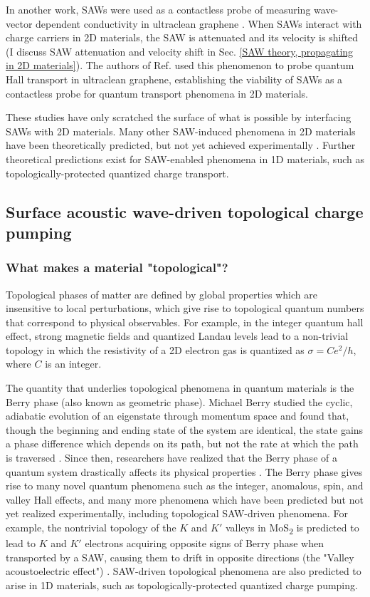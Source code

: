 \documentclass[double,12pt,1in]{beavtex}
\begin{document}
In another work, SAWs were used as a contactless probe of measuring wave-vector dependent conductivity in ultraclean graphene \cite{fang_quantum_2023}. When SAWs interact with charge carriers in 2D materials, the SAW is attenuated and its velocity is shifted (I discuss SAW attenuation and velocity shift in Sec. \ref{SAW theory, propagating in 2D materials}). The authors of Ref. \cite{fang_quantum_2023} used this phenomenon to probe quantum Hall transport in ultraclean graphene, establishing the viability of SAWs as a contactless probe for quantum transport phenomena in 2D materials. 

These studies have only scratched the surface of what is possible by interfacing SAWs with 2D materials. Many other SAW-induced phenomena in 2D materials have been theoretically predicted, but not yet achieved experimentally \cite{nie_surface_2023}. Further theoretical predictions exist for SAW-enabled phenomena in 1D materials, such as topologically-protected quantized charge transport.

\subsection{Surface acoustic wave-driven topological charge pumping}

\subsubsection{What makes a material "topological"?}

Topological phases of matter are defined by global properties which are insensitive to local perturbations, which give rise to topological quantum numbers that correspond to physical observables. For example, in the integer quantum hall effect, strong magnetic fields and quantized Landau levels lead to a non-trivial topology in which the resistivity of a 2D electron gas is quantized as $\sigma = C e^2/h$, where $C$ is an integer. 

The quantity that underlies topological phenomena in quantum materials is the Berry phase (also known as geometric phase). Michael Berry studied the cyclic, adiabatic evolution of an eigenstate through momentum space and found that, though the beginning and ending state of the system are identical, the state gains a phase difference which depends on its path, but not the rate at which the path is traversed \cite{berry_quantal_1984}. Since then, researchers have realized that the Berry phase of a quantum system drastically affects its physical properties \cite{xiao_berry_2010}. The Berry phase gives rise to many novel quantum phenomena such as the integer, anomalous, spin, and valley Hall effects, and many more phenomena which have been predicted but not yet realized experimentally, including topological SAW-driven phenomena. For example, the nontrivial topology of the $K$ and $K'$ valleys in MoS\textsubscript{2} is predicted to lead to $K$ and $K'$ electrons acquiring opposite signs of Berry phase when transported by a SAW, causing them to drift in opposite directions (the "Valley acoustoelectric effect") \cite{kalameitsev_valley_2019}. SAW-driven topological phenomena are also predicted to arise in 1D materials, such as topologically-protected quantized charge pumping.
\end{document}
